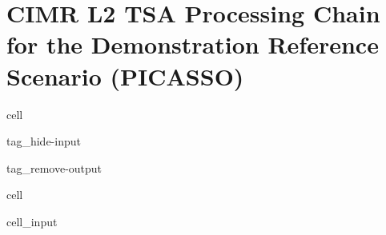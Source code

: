 \documentclass[letterpaper,10pt,english]{jupyterBook}
\begin{document}
\section{CIMR L2 TSA Processing Chain for the Demonstration Reference Scenario (PICASSO)}
\label{\detokenize{algorithm/CIMR_L2_TSA_PICASSO:cimr-l2-tsa-processing-chain-for-the-demonstration-reference-scenario-picasso}}\label{\detokenize{algorithm/CIMR_L2_TSA_PICASSO::doc}}
\begin{sphinxuseclass}{cell}
\begin{sphinxuseclass}{tag_hide-input}
\begin{sphinxuseclass}{tag_remove-output}
\end{sphinxuseclass}
\end{sphinxuseclass}
\end{sphinxuseclass}
\begin{sphinxuseclass}{cell}\begin{sphinxVerbatimInput}

\begin{sphinxuseclass}{cell_input}
\begin{sphinxVerbatim}[commandchars=\\\{\}]
  
  

    
  
\end{sphinxVerbatim}

\end{sphinxuseclass}\end{sphinxVerbatimInput}

\end{sphinxuseclass}
\end{document}
